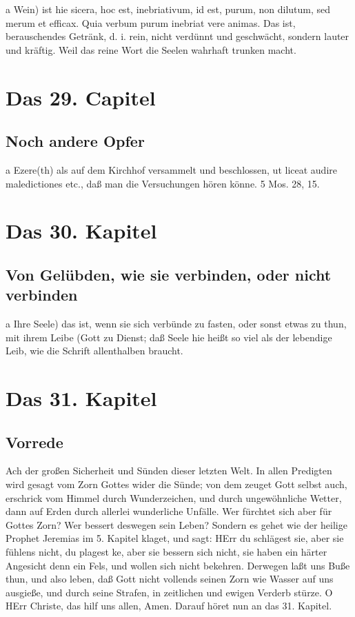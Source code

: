 a Wein) ist hie sicera, hoc est, inebriativum, id est, purum, non dilutum, sed merum et efficax. Quia verbum purum inebriat vere animas. Das ist, berauschendes Getränk, d. i. rein, nicht verdünnt und geschwächt, sondern lauter und kräftig. Weil das reine Wort die Seelen wahrhaft trunken macht.

\chapter{Das 29. Capitel}

\section{Noch andere Opfer}

a Ezere(th) als auf dem Kirchhof versammelt und beschlossen, ut liceat audire maledictiones etc., daß man die Versuchungen hören könne. 5 Mos. 28, 15.

\chapter{Das 30. Kapitel}

\section{Von Gelübden, wie sie verbinden, oder nicht verbinden}

a Ihre Seele) das ist, wenn sie sich verbünde zu fasten, oder sonst etwas zu thun, mit ihrem Leibe (Gott zu Dienst; daß Seele hie heißt so viel als der lebendige Leib, wie die Schrift allenthalben braucht.

\chapter{Das 31. Kapitel}

\section{Vorrede}

Ach der großen Sicherheit und Sünden dieser letzten Welt. In allen Predigten wird gesagt vom Zorn Gottes wider die Sünde; von dem zeuget Gott selbst auch, erschrick vom Himmel durch Wunderzeichen, und durch ungewöhnliche Wetter, dann auf Erden durch allerlei wunderliche Unfälle. Wer fürchtet sich aber für Gottes Zorn? Wer bessert deswegen sein Leben? Sondern es gehet wie der heilige Prophet Jeremias im 5. Kapitel klaget, und sagt: HErr du schlägest sie, aber sie fühlens nicht, du plagest
ke, aber sie bessern sich nicht, sie haben ein härter Angesicht denn ein Fels, und wollen sich nicht bekehren. Derwegen laßt uns Buße thun, und also leben, daß Gott nicht vollends seinen Zorn wie Wasser auf uns ausgieße, und durch seine Strafen, in zeitlichen und ewigen Verderb stürze. O HErr Christe, das hilf uns allen, Amen. Darauf höret nun an das 31. Kapitel.

